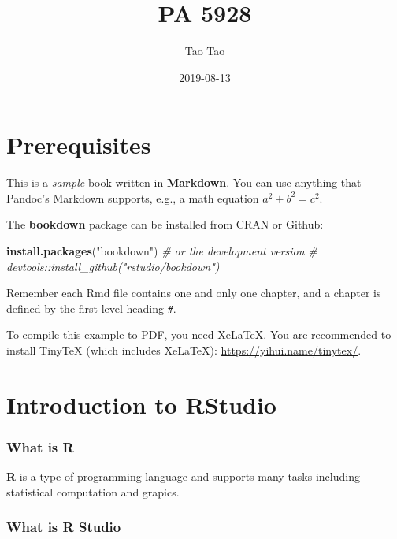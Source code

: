 \documentclass[]{book}
\title{PA 5928}
\author{Tao Tao}
\date{2019-08-13}
\newenvironment{Shaded}{\begin{snugshade}}{\end{snugshade}}
\newcommand{\CommentTok}[1]{\textcolor[rgb]{0.56,0.35,0.01}{\textit{#1}}}
\newcommand{\KeywordTok}[1]{\textcolor[rgb]{0.13,0.29,0.53}{\textbf{#1}}}
\newcommand{\NormalTok}[1]{#1}
\newcommand{\StringTok}[1]{\textcolor[rgb]{0.31,0.60,0.02}{#1}}
\begin{document}
\maketitle

{
\setcounter{tocdepth}{1}
\tableofcontents
}
\hypertarget{prerequisites}{%
\chapter{Prerequisites}\label{prerequisites}}

This is a \emph{sample} book written in \textbf{Markdown}. You can use anything that Pandoc's Markdown supports, e.g., a math equation \(a^2 + b^2 = c^2\).

The \textbf{bookdown} package can be installed from CRAN or Github:

\begin{Shaded}
\begin{Highlighting}[]
\KeywordTok{install.packages}\NormalTok{(}\StringTok{"bookdown"}\NormalTok{)}
\CommentTok{# or the development version}
\CommentTok{# devtools::install_github("rstudio/bookdown")}
\end{Highlighting}
\end{Shaded}

Remember each Rmd file contains one and only one chapter, and a chapter is defined by the first-level heading \texttt{\#}.

To compile this example to PDF, you need XeLaTeX. You are recommended to install TinyTeX (which includes XeLaTeX): \url{https://yihui.name/tinytex/}.

\hypertarget{introduction-to-rstudio}{%
\chapter{Introduction to RStudio}\label{introduction-to-rstudio}}

\hypertarget{what-is-r}{%
\subsection{What is R}\label{what-is-r}}

\textbf{R} is a type of programming language and supports many tasks including statistical computation and grapics.

\hypertarget{what-is-r-studio}{%
\subsection{What is R Studio}\label{what-is-r-studio}}
\end{document}
